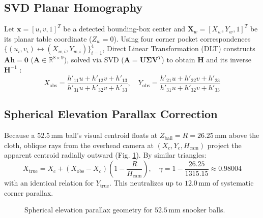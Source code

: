 \documentclass[conference]{IEEEtran}
\begin{document}
\subsection{SVD Planar Homography}
Let $\mathbf{x} = [u, v, 1]^T$ be a detected bounding-box center and $\mathbf{X}_w = [X_w, Y_w, 1]^T$ be its planar table coordinate ($Z_w = 0$). Using four corner pocket correspondences $\{ (u_i, v_i) \leftrightarrow (X_{w,i}, Y_{w,i}) \}_{i=1}^4$, Direct Linear Transformation (DLT) constructs $\mathbf{A}\mathbf{h} = \mathbf{0}$ ($\mathbf{A} \in \mathbb{R}^{8 \times 9}$), solved via SVD ($\mathbf{A} = \mathbf{U}\mathbf{\Sigma}\mathbf{V}^T$) to obtain $\mathbf{H}$ and its inverse $\mathbf{H}^{-1}$ \cite{ref19, ref35}:
\begin{equation}
    X_{\text{obs}} = \frac{h'_{11} u + h'_{12} v + h'_{13}}{h'_{31} u + h'_{32} v + h'_{33}}, \quad
    Y_{\text{obs}} = \frac{h'_{21} u + h'_{22} v + h'_{23}}{h'_{31} u + h'_{32} v + h'_{33}}
\end{equation}

\subsection{Spherical Elevation Parallax Correction}
Because a $52.5\,\text{mm}$ ball's visual centroid floats at $Z_{\text{ball}} = R = 26.25\,\text{mm}$ above the cloth, oblique rays from the overhead camera at $(X_c, Y_c, H_{\text{cam}})$ project the apparent centroid radially outward (Fig. \ref{fig:parallax}). By similar triangles:
\begin{equation}
    X_{\text{true}} = X_c + (X_{\text{obs}} - X_c)\left(1 - \frac{R}{H_{\text{cam}}}\right), \quad
    \gamma = 1 - \frac{26.25}{1315.15} \approx 0.98004
\end{equation}
with an identical relation for $Y_{\text{true}}$. This neutralizes up to $12.0\,\text{mm}$ of systematic corner parallax.

\begin{figure}[htbp]
\centering
{}
\caption{Spherical elevation parallax geometry for $52.5\,\text{mm}$ snooker balls.}
\label{fig:parallax}
\end{figure}
\end{document}
